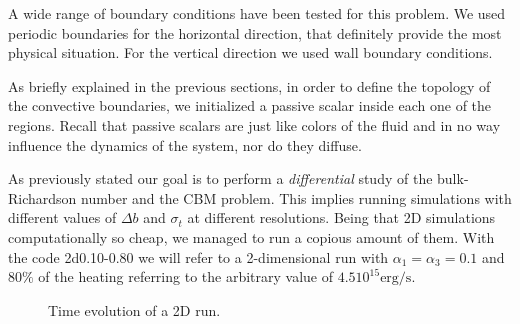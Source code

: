 A wide range of boundary conditions have been tested for this problem. We used periodic boundaries for the horizontal direction, that definitely provide the most physical situation. For the vertical direction we used wall boundary conditions.

As briefly explained in the previous sections, in order to define the topology of the convective boundaries, we initialized a passive scalar inside each one of the regions. Recall that passive scalars are just like colors of the fluid and in no way influence the dynamics of the system, nor do they diffuse.

As previously stated our goal is to perform a \textit{differential} study of the bulk-Richardson number and the CBM problem. This implies running simulations with different values of $\Delta b$ and $\sigma_t$ at different resolutions. Being that 2D simulations computationally so cheap, we managed to run a copious amount of them. With the code 2d0.10-0.80 we will refer to a 2-dimensional run with $\alpha_{1} = \alpha_{3}=0.1$ and $80 \%$ of the heating referring to the arbitrary value of $4.5 10^{15} \mathrm{erg/s}$.
\begin{figure}[t!]
      \centering
     \centering
	\hfill
	\caption{Time evolution of a 2D run.}
	\label{2dsingle}
\end{figure}

